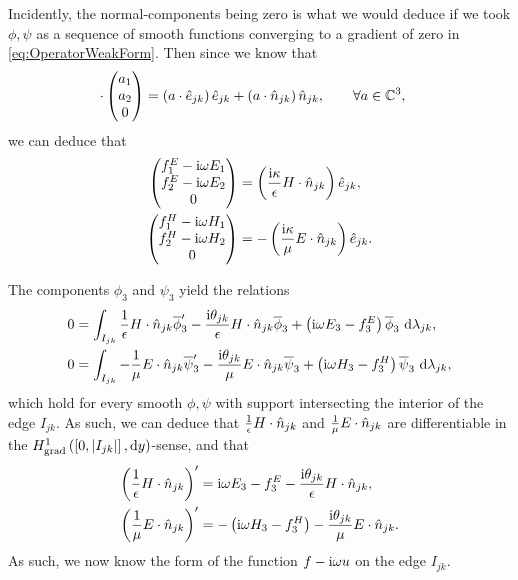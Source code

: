 \documentclass[11pt]{report}
\begin{document}
Incidently, the normal-components being zero is what we would deduce if we took $\phi,\psi$ as a sequence of smooth functions converging to a gradient of zero in \eqref{eq:OperatorWeakForm}.
Then since we know that
\begin{align*}
	\cdot\begin{pmatrix} a_1 \\ a_2 \\ 0 \end{pmatrix}
	&= \left( a\cdot\hat{e}_{jk} \right)\hat{e}_{jk} + \left( a\cdot\hat{n}_{jk} \right)\hat{n}_{jk},
	\qquad\forall a\in\mathbb{C}^3,
\end{align*}
we can deduce that
\begin{align*}
	\begin{pmatrix} f^E_1 - \mathrm{i}\omega E_1 \\ f^E_2 - \mathrm{i}\omega E_2 \\ 0 \end{pmatrix}
	&= \left( \frac{\mathrm{i}\kappa}{\epsilon}H\cdot\hat{n}_{jk} \right)\hat{e}_{jk}, \\
	\begin{pmatrix} f^H_1 - \mathrm{i}\omega H_1 \\ f^H_2 - \mathrm{i}\omega H_2 \\ 0 \end{pmatrix}
	&= -\left( \frac{\mathrm{i}\kappa}{\mu}E\cdot\hat{n}_{jk} \right)\hat{e}_{jk}.
\end{align*}

The components $\phi_3$ and $\psi_3$ yield the relations
\begin{align*}
	0 &= \int_{I_{jk}} \frac{1}{\epsilon}H\cdot\hat{n}_{jk}\overline{\phi}_3' - \frac{\mathrm{i}\theta_{jk}}{\epsilon}H\cdot\hat{n}_{jk}\overline{\phi}_3 + \left( \mathrm{i}\omega E_3 - f^E_3 \right)\overline{\phi}_3  \ \mathrm{d}\lambda_{jk}, \\
	0 &= \int_{I_{jk}} -\frac{1}{\mu}E\cdot\hat{n}_{jk}\overline{\psi}_3' - \frac{\mathrm{i}\theta_{jk}}{\mu}E\cdot\hat{n}_{jk}\overline{\psi}_3 + \left( \mathrm{i}\omega H_3 - f^H_3 \right)\overline{\psi}_3  \ \mathrm{d}\lambda_{jk},	
\end{align*}
which hold for every smooth $\phi, \psi$ with support intersecting the interior of the edge $I_{jk}$.
As such, we can deduce that $\frac{1}{\epsilon}H\cdot\hat{n}_{jk}$ and $\frac{1}{\mu}E\cdot\hat{n}_{jk}$ are differentiable in the $H^1_\mathrm{grad}\left( \left[ 0,\left\lvert I_{jk} \right\rvert \right], \mathrm{d}y \right)$-sense, and that
\begin{align*}
	\left( \frac{1}{\epsilon}H\cdot\hat{n}_{jk} \right)' &= \mathrm{i}\omega E_3 - f^E_3 - \frac{\mathrm{i}\theta_{jk}}{\epsilon}H\cdot\hat{n}_{jk}, \\
	\left( \frac{1}{\mu}E\cdot\hat{n}_{jk} \right)' &= -\left( \mathrm{i}\omega H_3 - f^H_3 \right) - \frac{\mathrm{i}\theta_{jk}}{\mu}E\cdot\hat{n}_{jk}.
\end{align*}
As such, we now know the form of the function $f-\mathrm{i}\omega u$ on the edge $I_{jk}$.
\end{document}

